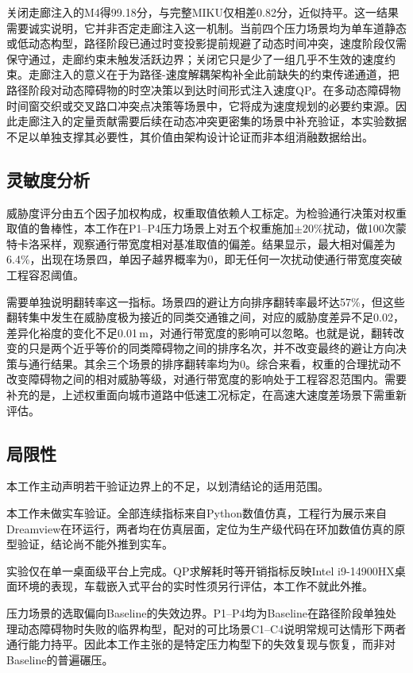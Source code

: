\documentclass[a4paper,11pt]{ctexart}
\theoremstyle{definition}
\begin{document}
关闭走廊注入的M4得99.18分，与完整MIKU仅相差0.82分，近似持平。这一结果需要诚实说明，它并非否定走廊注入这一机制。当前四个压力场景均为单车道静态或低动态构型，路径阶段已通过时变投影提前规避了动态时间冲突，速度阶段仅需保守通过，走廊约束未触发活跃边界；关闭它只是少了一组几乎不生效的速度约束。走廊注入的意义在于为路径-速度解耦架构补全此前缺失的约束传递通道，把路径阶段对动态障碍物的时空决策以到达时间形式注入速度QP。在多动态障碍物时间窗交织或交叉路口冲突点决策等场景中，它将成为速度规划的必要约束源。因此走廊注入的定量贡献需要后续在动态冲突更密集的场景中补充验证，本实验数据不足以单独支撑其必要性，其价值由架构设计论证而非本组消融数据给出。

\subsection{灵敏度分析}
\label{subsec:exp_sensitivity}

威胁度评分由五个因子加权构成，权重取值依赖人工标定。为检验通行决策对权重取值的鲁棒性，本工作在P1--P4压力场景上对五个权重施加$\pm 20\%$扰动，做100次蒙特卡洛采样，观察通行带宽度相对基准取值的偏差。结果显示，最大相对偏差为6.4\%，出现在场景四，单因子越界概率为0，即无任何一次扰动使通行带宽度突破工程容忍阈值。

需要单独说明翻转率这一指标。场景四的避让方向排序翻转率最坏达57\%，但这些翻转集中发生在威胁度极为接近的同类交通锥之间，对应的威胁度差异不足0.02，差异化裕度的变化不足0.01\,m，对通行带宽度的影响可以忽略。也就是说，翻转改变的只是两个近乎等价的同类障碍物之间的排序名次，并不改变最终的避让方向决策与通行结果。其余三个场景的排序翻转率均为0。综合来看，权重的合理扰动不改变障碍物之间的相对威胁等级，对通行带宽度的影响处于工程容忍范围内。需要补充的是，上述权重面向城市道路中低速工况标定，在高速大速度差场景下需重新评估。

\subsection{局限性}
\label{subsec:exp_limitations}

本工作主动声明若干验证边界上的不足，以划清结论的适用范围。

本工作未做实车验证。全部连续指标来自Python数值仿真，工程行为展示来自Dreamview在环运行，两者均在仿真层面，定位为生产级代码在环加数值仿真的原型验证，结论尚不能外推到实车。

实验仅在单一桌面级平台上完成。QP求解耗时等开销指标反映Intel i9-14900HX桌面环境的表现，车载嵌入式平台的实时性须另行评估，本工作不就此外推。

压力场景的选取偏向Baseline的失效边界。P1--P4均为Baseline在路径阶段单独处理动态障碍物时失败的临界构型，配对的可比场景C1--C4说明常规可达情形下两者通行能力持平。因此本工作主张的是特定压力构型下的失效复现与恢复，而非对Baseline的普遍碾压。
\end{document}
